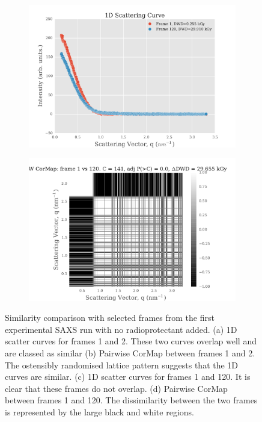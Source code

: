 \begin{figure}
\begin{subfigure}[b]{0.45\textwidth}
            \includegraphics[width=\textwidth]{figures/saxs/scatter_curve_frames_1_120.pdf}
            \caption{}
            \label{fig:1D scatter plot of frames 1 and 120}
    \end{subfigure}
    \qquad
    \begin{subfigure}[b]{0.45\textwidth}
            \centering
            \includegraphics[width=\textwidth]{figures/saxs/pwcormap_frames_1_120.pdf}
            \caption{}
            \label{fig:Pairwise correlation frames 1 and 120}
    \end{subfigure}
    \caption{Similarity comparison with selected frames from the first experimental SAXS run with no radioprotectant added. (a) 1D scatter curves for frames 1 and 2. These two curves overlap well and are classed as similar (b) Pairwise CorMap between frames 1 and 2. The ostensibly randomised lattice pattern suggests that the 1D curves are similar. (c) 1D scatter curves for frames 1 and 120. It is clear that these frames do not overlap. (d) Pairwise CorMap between frames 1 and 120. The dissimilarity between the two frames is represented by the large black and white regions.}
    \label{fig:Pairwise correlation plots}
\end{figure}

